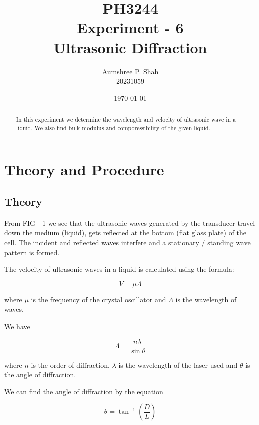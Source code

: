 \documentclass[%
sor,
 jor,
 amsmath,amssymb,
 reprint,
longbibliography,
]{revtex4-2}
\begin{document}
\title{PH3244\\Experiment - 6\\Ultrasonic Diffraction}
\author{Aumshree P. Shah\\20231059}
\date{\today}
\begin{abstract}
In this experiment we determine the wavelength and velocity of ultrasonic wave in a liquid. We also find bulk modulus and comporessibility of the given liquid. 
\centering
\end{abstract}
\maketitle
\tableofcontents
\vspace*{\fill}
\pagebreak
\pagebreak
\section{Theory and Procedure}
\subsection{Theory}
	From FIG - 1 we see that the ultrasonic waves generated by the transducer travel down the medium (liquid), gets reflected at the bottom (flat glass
plate) of the cell. The incident and reflected waves interfere and a
stationary / standing wave pattern is formed.

The velocity of ultrasonic waves in a liquid is calculated using the formula:

\begin{equation}
V = \mu \Lambda
\label{EQ1}
\end{equation}

where $\mu$ is the frequency of the crystal oscillator and $\Lambda$ is the
wavelength of waves.

We have

\begin{equation}
\Lambda = \frac{n\lambda}{\sin \theta}
\label{EQ2}
\end{equation}

where $n$ is the order of diffraction, $\lambda$ is the wavelength of the
laser used and $\theta$ is the angle of diffraction.

We can find the angle of diffraction by the equation

\begin{equation}
\theta = \tan^{-1}\left(\frac{D}{L}\right)
\label{EQ3}
\end{equation}
\end{document}
